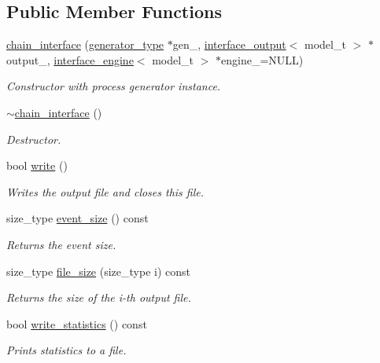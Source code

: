 \subsection*{Public Member Functions}
\begin{DoxyCompactItemize}
\item 
\hypertarget{a00066_ac6944448a45f1281886b040b50287b8b}{\hyperlink{a00066_ac6944448a45f1281886b040b50287b8b}{chain\-\_\-interface} (\hyperlink{a00442}{generator\-\_\-type} $\ast$gen\-\_\-, \hyperlink{a00315}{interface\-\_\-output}$<$ model\-\_\-t $>$ $\ast$output\-\_\-, \hyperlink{a00314}{interface\-\_\-engine}$<$ model\-\_\-t $>$ $\ast$engine\-\_\-=N\-U\-L\-L)}\label{a00066_ac6944448a45f1281886b040b50287b8b}

\begin{DoxyCompactList}\small\item\em Constructor with process generator instance. \end{DoxyCompactList}\item 
\hypertarget{a00066_aedbfe0b70fa152c87c06b87d653bfba0}{\hyperlink{a00066_aedbfe0b70fa152c87c06b87d653bfba0}{$\sim$chain\-\_\-interface} ()}\label{a00066_aedbfe0b70fa152c87c06b87d653bfba0}

\begin{DoxyCompactList}\small\item\em Destructor. \end{DoxyCompactList}\item 
bool \hyperlink{a00066_ab02f54cbb2cf5ec5d477fbdd08f9df76}{write} ()
\begin{DoxyCompactList}\small\item\em Writes the output file and closes this file. \end{DoxyCompactList}\item 
\hypertarget{a00066_aa9195022d17d5b78774251d9f1ccca17}{size\-\_\-type \hyperlink{a00066_aa9195022d17d5b78774251d9f1ccca17}{event\-\_\-size} () const }\label{a00066_aa9195022d17d5b78774251d9f1ccca17}

\begin{DoxyCompactList}\small\item\em Returns the event size. \end{DoxyCompactList}\item 
\hypertarget{a00066_abad8625cf7fb9ab53d520e7e60f6f555}{size\-\_\-type \hyperlink{a00066_abad8625cf7fb9ab53d520e7e60f6f555}{file\-\_\-size} (size\-\_\-type i) const }\label{a00066_abad8625cf7fb9ab53d520e7e60f6f555}

\begin{DoxyCompactList}\small\item\em Returns the size of the i-\/th output file. \end{DoxyCompactList}\item 
\hypertarget{a00066_ace62e874a6f3da373b49c197d3998aae}{bool \hyperlink{a00066_ace62e874a6f3da373b49c197d3998aae}{write\-\_\-statistics} () const }\label{a00066_ace62e874a6f3da373b49c197d3998aae}

\begin{DoxyCompactList}\small\item\em Prints statistics to a file. \end{DoxyCompactList}\end{DoxyCompactItemize}
